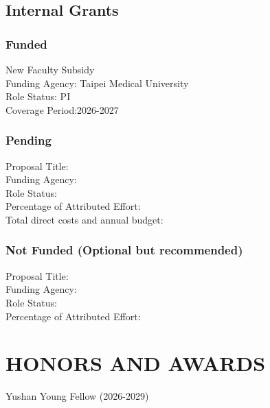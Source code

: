 \documentclass[a4paper,9pt]{extarticle}
\newenvironment{subs} %
  {\adjustwidth{2em}{0pt}}
  {\endadjustwidth}
\begin{document}
    \subsection*{Internal Grants}
    \begin{subs}
        \subsubsection*{Funded}       
			New Faculty Subsidy \\
            Funding Agency: Taipei Medical University \\
            Role Status: PI \\
            Coverage Period:2026-2027
        \subsubsection*{Pending}
            Proposal Title:\\
            Funding Agency:\\
            Role Status: \\
            Percentage of Attributed Effort: \\
            Total direct costs and annual budget:
        \subsubsection*{Not Funded (Optional but recommended)}
            Proposal Title:\\
            Funding Agency:\\
            Role Status: \\
            Percentage of Attributed Effort: 
    \end{subs}

\section*{HONORS AND AWARDS}
	Yushan Young Fellow (2026-2029)\\
	
\end{document}
